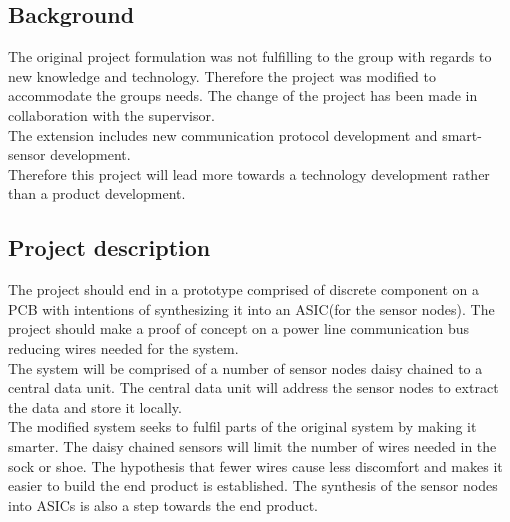 \subsection{Background}
The original project formulation was not fulfilling to the group with regards to new knowledge and technology. Therefore the project was modified to accommodate the groups needs. The change of the project has been made in collaboration with the supervisor.\\
The extension includes new communication protocol development and smart-sensor development.\\
Therefore this project will lead more towards a technology development rather than a product development.\\

\subsection{Project description}
The project should end in a prototype comprised of discrete component on a PCB with intentions of synthesizing it into an ASIC(for the sensor nodes). The project should make a proof of concept on a power line communication bus reducing wires needed for the system.\\
The system will be comprised of a number of sensor nodes daisy chained to a central data unit. The central data unit will address the sensor nodes to extract the data and store it locally.\\
The modified system seeks to fulfil parts of the original system by making it smarter. The daisy chained sensors will limit the number of wires needed in the sock or shoe. The hypothesis that fewer wires cause less discomfort and makes it easier to build the end product is established. The synthesis of the sensor nodes into ASICs is also a step towards the end product.\\

